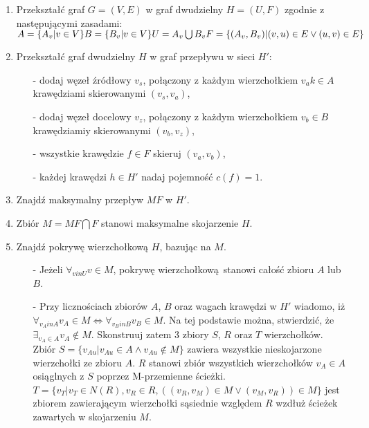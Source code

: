 \begin{enumerate}
  \item Przekształć graf $G=(V,E)$ w graf dwudzielny $H=(U,F)$ zgodnie z
    następującymi zasadami:\\
    $A=\{A_v|v \in V\}\\
    B=\{B_v|v \in V\}\\
    U=A_v \bigcup B_v
    F=\{(A_v, B_v)|(v,u) \in E \lor (u,v) \in E\}$
  \item Przekształć graf dwudzielny $H$ w graf przepływu w sieci $H\prime$:
    \begin{itemize}
      \item[-] dodaj węzeł źródłowy $v_s$, połączony z każdym wierzchołkiem $v_a
        k\in A$ krawędziami skierowanymi $(v_s, v_a)$,
      \item[-] dodaj węzeł docelowy $v_z$, połączony z każdym wierzchołkiem $v_b
        \in B$ krawędziamiy skierowanymi $(v_b, v_z)$,
      \item[-] wszystkie krawędzie $f \in F$ skieruj $(v_a, v_b)$,
      \item[-] każdej krawędzi $h \in H\prime$ nadaj pojemność $c(f)=1$.
    \end{itemize}
  \item Znajdź maksymalny przepływ $MF$ w $H\prime$.
  \item Zbiór $M=MF \bigcap F$ stanowi maksymalne skojarzenie $H$.
  \item Znajdź pokrywę wierzchołkową $H$, bazując na $M$.
    \begin{itemize}
      \item[-] Jeżeli $\forall_{v in U}{v \in M}$, pokrywę
        wierzchołkową~stanowi całość zbioru $A$ lub $B$.
      \item[-] Przy licznościach zbiorów $A$, $B$ oraz wagach krawędzi w $H\prime$
        wiadomo, iż ${\forall_{v_A in A}{v_A \in M} \iff \forall_{v_B in B}{v_B \in M}}$.
        Na tej podstawie można, stwierdzić, że $\exists_{v_A \in A}{v_A \notin
        M}$.
        Skonstruuj zatem 3 zbiory $S$, $R$ oraz $T$ wierzchołków. Zbiór
        $S = \{v_{Au}|v_{Au} \in A \land v_{Au} \notin M\}$ zawiera wszystkie
        nieskojarzone wierzchołki ze zbioru $A$.
        $R$ stanowi zbiór wszystkich wierzchołków $v_A \in A$ osiąglnych z $S$
        poprzez M-przemienne ścieżki. \\
        $T=\{v_T|v_T \in N(R), v_R \in R, ((v_R,v_M) \in M \lor (v_M,v_R)) \in M\}$ 
        jest zbiorem zawierającym wierzchołki sąsiednie względem $R$ wzdłuż 
        ścieżek zawartych w skojarzeniu $M$.

\end{itemize}
\end{enumerate}
